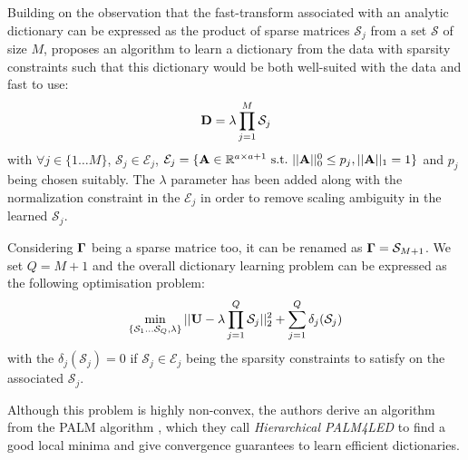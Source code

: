 Building on the observation that the fast-transform associated with an analytic dictionary can be expressed as the product of sparse matrices $\mathcal{S}_j$ from a set $\mathcal{S}$ of size $M$, \cite{magoarou2014learning} proposes an algorithm to learn a dictionary from the data with sparsity constraints such that this dictionary would be both well-suited with the data and fast to use:
%
\begin{equation}
{\mathbf{D}} = \lambda \prod_{j=1}^{M}\mathcal{S}_j
\end{equation}
%
with $\forall j \in \{1 \ldots M\}$, $\mathcal{S}_j \in \mathcal{E}_j$, $\mathcal{E}_j = \lbrace {\mathbf{A}} \in \mathbb{R}^{a \times a+1}~\text{s.t.}~||{\mathbf{A}}||_0^0 \leq p_j, ||{\mathbf{A}}||_1 = 1 \rbrace$ and $p_j$ being chosen suitably. The $\lambda$ parameter has been added along with the normalization constraint in the $\mathcal{E}_j$ in order to remove scaling ambiguity in the learned $\mathcal{S}_j$.

Considering ${\mathbf{\Gamma}}$ being a sparse matrice too, it can be renamed as ${\mathbf{\Gamma}} = \mathcal{S}_{M+1}$. We set $Q = M+1$ and the overall dictionary learning problem can be expressed as the following optimisation problem:
%
\begin{equation}
\label{eq:problem_gribon}
\min_{\{\mathcal{S}_1 \dots \mathcal{S}_Q, \lambda\}} ||{\mathbf{U}} - \lambda \prod_{j=1}^{Q}{\mathcal{S}_j}||_2^2 + \sum_{j=1}^{Q} \delta_j(\mathcal{S}_j)
\end{equation}
%
with the $\delta_j(\mathcal{S}_j) = 0$ if $\mathcal{S}_j \in \mathcal{E}_j$ being the sparsity constraints to satisfy on the associated $\mathcal{S}_j$.

Although this problem is highly non-convex, the authors derive an algorithm from the PALM algorithm \cite{bolte2014proximal}, which they call \textit{Hierarchical PALM4LED} to find a good local minima and give convergence guarantees to learn efficient dictionaries.



